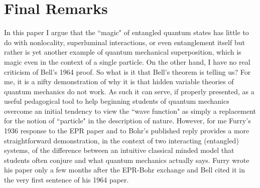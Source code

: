 \documentclass[12pt]{article}
\begin{document}
\section{Final Remarks} \label{FR}

In this paper I argue that the ``magic" of entangled quantum states has little to do with nonlocality, superluminal interactions, or even entanglement itself but rather is yet another example of quantum mechanical superposition, which is magic even in the context of a single particle.  On the other hand, I have no real criticism of Bell's 1964 proof.  So what is it that Bell's theorem is telling us?  For me, it is a nifty demonstration of why it is that hidden variable theories of quantum mechanics do not work. As such it can serve, if properly presented, as a useful pedagogical tool to help beginning students of quantum mechanics overcome an initial tendency to view the ``wave function" as simply a replacement for the notion of ``particle" in the description of nature.  However, for me Furry's 1936 response to the EPR paper and to Bohr's published reply provides a more straightforward demonstration, in the context of two interacting (entangled) systems, of the difference between an intuitive classical minded model that students often conjure and what quantum mechanics actually says.  Furry wrote his paper only a few months after the EPR-Bohr exchange and Bell cited it in the very first sentence of his 1964 paper.
\end{document}

